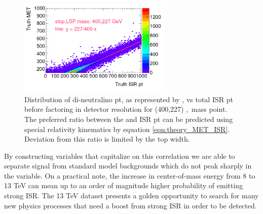 \begin{figure}[h!]
  \centering
	\includegraphics[width=0.65\textwidth]{./figures/MET_ISR.png}
\caption{\label{fig:stop_400_227_ISR_MET_truth}{Distribution of di-neutralino pt, as represented by \met, vs total ISR pt before factoring in detector resolution for (400,227) \stop,\ninoone~mass point.  The preferred ratio between the \met and ISR pt can be predicted using special relativity kinematics by equation \ref{eqn:theory_MET_ISR}.  Deviation from this ratio is limited by the top width. }}
\end{figure}

\indent By constructing variables that capitalize on this correlation we are able to separate signal from standard model backgrounds which do not peak sharply in the \RISR variable.  On a practical note, the increase in center-of-mass energy from 8 to 13 TeV can mean up to an order of magnitude higher probability of emitting strong ISR.  The 13 TeV dataset presents a golden opportunity to search for many new physics processes that need a boost from strong ISR in order to be detected. \\